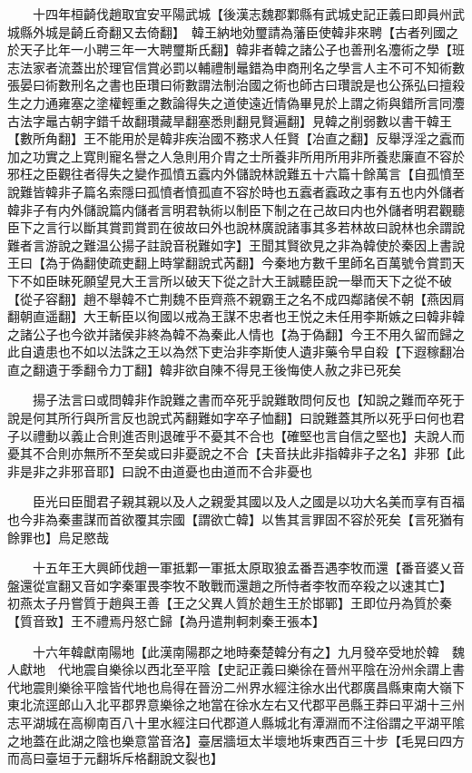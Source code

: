 　　十四年桓齮伐趙取宜安平陽武城【後漢志魏郡鄴縣有武城史記正義曰即員州武城縣外城是齮丘奇翻又去倚翻】　韓王納地効璽請為藩臣使韓非來聘【古者列國之於天子比年一小聘三年一大聘璽斯氏翻】韓非者韓之諸公子也善刑名灋術之學【班志法家者流蓋出於理官信賞必罰以輔禮制鼂錯為申商刑名之學言人主不可不知術數張晏曰術數刑名之書也臣瓚曰術數謂法制治國之術也師古曰瓚說是也公孫弘曰擅殺生之力通雍塞之塗權輕重之數論得失之道使遠近情偽畢見於上謂之術與錯所言同灋古法字鼂古朝字錯千故翻瓚藏旱翻塞悉則翻見賢遍翻】見韓之削弱數以書干韓王【數所角翻】王不能用於是韓非疾治國不務求人任賢【冶直之翻】反舉浮淫之蠧而加之功實之上寛則寵名譽之人急則用介胄之士所養非所用所用非所養悲廉直不容於邪枉之臣觀往者得失之變作孤憤五蠧内外儲說林說難五十六篇十餘萬言【自孤憤至說難皆韓非子篇名索隱曰孤憤者憤孤直不容於時也五蠧者蠧政之事有五也内外儲者韓非子有内外儲說篇内儲者言明君執術以制臣下制之在己故曰内也外儲者明君觀聽臣下之言行以斷其賞罰賞罰在彼故曰外也說林廣說諸事其多若林故曰說林也余謂說難者言游說之難温公揚子註說音税難如字】王聞其賢欲見之非為韓使於秦因上書說王曰【為于偽翻使疏吏翻上時掌翻說式芮翻】今秦地方數千里師名百萬號令賞罰天下不如臣昧死願望見大王言所以破天下從之計大王誠聽臣說一舉而天下之從不破【從子容翻】趙不舉韓不亡荆魏不臣齊燕不親霸王之名不成四鄰諸侯不朝【燕因肩翻朝直遥翻】大王斬臣以徇國以戒為王謀不忠者也王悦之未任用李斯嫉之曰韓非韓之諸公子也今欲并諸侯非終為韓不為秦此人情也【為于偽翻】今王不用久留而歸之此自遺患也不如以法誅之王以為然下吏治非李斯使人遺非藥令早自殺【下遐稼翻冶直之翻遺于季翻令力丁翻】韓非欲自陳不得見王後悔使人赦之非已死矣

　　揚子法言曰或問韓非作說難之書而卒死乎說難敢問何反也【知說之難而卒死于說是何其所行與所言反也說式芮翻難如字卒子恤翻】曰說難蓋其所以死乎曰何也君子以禮動以義止合則進否則退確乎不憂其不合也【確堅也言自信之堅也】夫說人而憂其不合則亦無所不至矣或曰非憂說之不合【夫音扶此非指韓非子之名】非邪【此非是非之非邪音耶】曰說不由道憂也由道而不合非憂也

　　臣光曰臣聞君子親其親以及人之親愛其國以及人之國是以功大名美而享有百福也今非為秦畫謀而首欲覆其宗國【謂欲亡韓】以售其言罪固不容於死矣【言死猶有餘罪也】烏足愍哉

　　十五年王大興師伐趙一軍抵鄴一軍抵太原取狼孟番吾遇李牧而還【番音婆乂音盤還從宣翻又音如字秦軍畏李牧不敢戰而還趙之所恃者李牧而卒殺之以速其亡】　初燕太子丹嘗質于趙與王善【王之父異人質於趙生王於邯鄲】王即位丹為質於秦【質音致】王不禮焉丹怒亡歸【為丹遣荆軻刺秦王張本】

　　十六年韓獻南陽地【此漢南陽郡之地時秦楚韓分有之】九月發卒受地於韓　魏人獻地　代地震自樂徐以西北至平陰【史記正義曰樂徐在晉州平陰在汾州余謂上書代地震則樂徐平陰皆代地也烏得在晉汾二州界水經注徐水出代郡廣昌縣東南大嶺下東北流逕郎山入北平郡界意樂徐之地當在徐水左右又代郡平邑縣王莽曰平湖十三州志平湖城在高柳南百八十里水經注曰代郡道人縣城北有潭淵而不注俗謂之平湖平隂之地蓋在此湖之陰也樂意當音洛】臺居牆垣太半壞地坼東西百三十步【毛晃曰四方而高曰臺垣于元翻坼斥格翻說文裂也】

